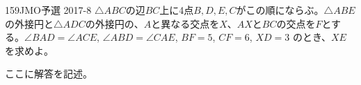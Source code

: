 \begin{prob}{159}{}{JMO予選 2017-8}
 $\triangle{ABC}$の辺$BC$上に4点$B, D, E, C$がこの順にならぶ。$\triangle{ABE}$の外接円と$\triangle{ADC}$の外接円の、$A$と異なる交点を$X$、$AX$と$BC$の交点を$F$とする。$\angle{BAD}=\angle{ACE}$, $\angle{ABD}=\angle{CAE}$, $BF=5$, $CF=6$, $XD=3$ のとき、$XE$を求めよ。
\end{prob}
ここに解答を記述。